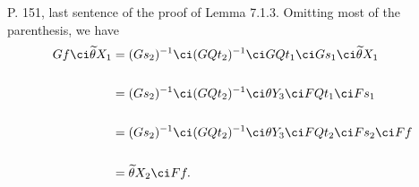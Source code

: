 \documentclass[12pt]{article}
\theoremstyle{remark}
\theoremstyle{definition}
\begin{document}
%

\begin{s}
P. 151, last sentence of the proof of Lemma 7.1.3. Omitting most of the parenthesis, we have 
\begin{align*}
Gf\ci\widetilde\theta X_1&=(Gs_2)^{-1}\ci(GQt_2)^{-1}\ci GQt_1\ci Gs_1\ci\widetilde\theta X_1\\ \\ 
&=(Gs_2)^{-1}\ci(GQt_2)^{-1}\ci \theta Y_3\ci FQt_1\ci Fs_1\\ \\ 
&=(Gs_2)^{-1}\ci(GQt_2)^{-1}\ci \theta Y_3\ci FQt_2\ci Fs_2\ci Ff\\ \\ 
&=\widetilde\theta X_2\ci Ff.
\end{align*}
\end{s}



%


%


\end{document}
